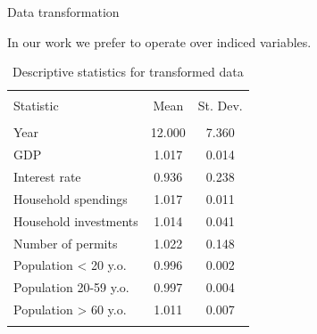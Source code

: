 \documentclass[11pt,ignorenonframetext,]{beamer}
\begin{document}
\begin{frame}{Data transformation}
\protect\hypertarget{data-transformation}{}

In our work we prefer to operate over indiced variables.

\FloatBarrier

\tiny

\begin{table}[!htbp] \centering 
\begin{tabular}{@{\extracolsep{5pt}}lcc} 
\\[-1.8ex]\hline 
\hline \\[-1.8ex] 
Statistic & \multicolumn{1}{c}{Mean} & \multicolumn{1}{c}{St. Dev.} \\ 
\hline \\[-1.8ex] 
Year & 12.000 & 7.360 \\ 
GDP & 1.017 & 0.014 \\ 
Interest rate & 0.936 & 0.238 \\ 
Household spendings & 1.017 & 0.011 \\ 
Household investments & 1.014 & 0.041 \\ 
Number of permits & 1.022 & 0.148 \\ 
Population < 20 y.o. & 0.996 & 0.002 \\ 
Population 20-59 y.o. & 0.997 & 0.004 \\ 
Population > 60 y.o. & 1.011 & 0.007 \\ 
\hline \\[-1.8ex] 
\end{tabular} 
  \caption{Descriptive statistics for transformed data} 
  \label{} 
\end{table}

\normalsize

\FloatBarrier

\end{frame}
\end{document}
